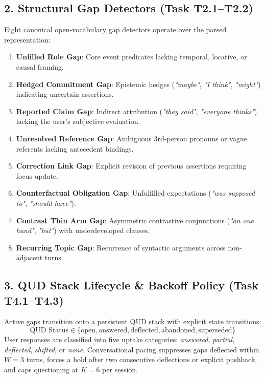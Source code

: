 \documentclass[11pt,a4paper]{article}
\begin{document}
\subsection{2. Structural Gap Detectors (Task T2.1--T2.2)}
Eight canonical open-vocabulary gap detectors operate over the parsed representation:
\begin{enumerate}
    \item \textbf{Unfilled Role Gap}: Core event predicates lacking temporal, locative, or causal framing.
    \item \textbf{Hedged Commitment Gap}: Epistemic hedges (\emph{"maybe"}, \emph{"I think"}, \emph{"might"}) indicating uncertain assertions.
    \item \textbf{Reported Claim Gap}: Indirect attribution (\emph{"they said"}, \emph{"everyone thinks"}) lacking the user's subjective evaluation.
    \item \textbf{Unresolved Reference Gap}: Ambiguous 3rd-person pronouns or vague referents lacking antecedent bindings.
    \item \textbf{Correction Link Gap}: Explicit revision of previous assertions requiring focus update.
    \item \textbf{Counterfactual Obligation Gap}: Unfulfilled expectations (\emph{"was supposed to"}, \emph{"should have"}).
    \item \textbf{Contrast Thin Arm Gap}: Asymmetric contrastive conjunctions (\emph{"on one hand"}, \emph{"but"}) with underdeveloped clauses.
    \item \textbf{Recurring Topic Gap}: Recurrence of syntactic arguments across non-adjacent turns.
\end{enumerate}

\subsection{3. QUD Stack Lifecycle \& Backoff Policy (Task T4.1--T4.3)}
Active gaps transition onto a persistent QUD stack with explicit state transitions:
\begin{equation}
    \text{QUD Status} \in \{\text{open}, \text{answered}, \text{deflected}, \text{abandoned}, \text{superseded}\}
\end{equation}
User responses are classified into five uptake categories: \emph{answered}, \emph{partial}, \emph{deflected}, \emph{shifted}, or \emph{none}. Conversational pacing suppresses gaps deflected within $W=3$ turns, forces a hold after two consecutive deflections or explicit pushback, and caps questioning at $K=6$ per session.
\end{document}
